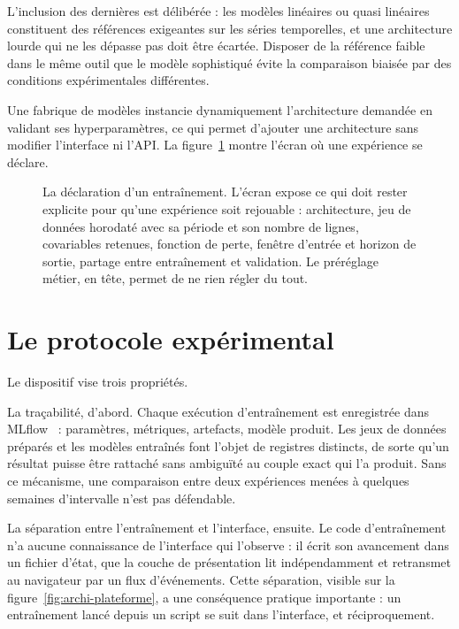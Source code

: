 L'inclusion des dernières est délibérée : les modèles linéaires ou quasi linéaires constituent
des références exigeantes sur les séries temporelles, et une architecture lourde qui ne les
dépasse pas doit être écartée. Disposer de la référence faible dans le même outil que le modèle
sophistiqué évite la comparaison biaisée par des conditions expérimentales différentes.

Une fabrique de modèles instancie dynamiquement l'architecture demandée en validant ses
hyperparamètres, ce qui permet d'ajouter une architecture sans modifier l'interface ni l'API.
La figure~\ref{fig:ia-config} montre l'écran où une expérience se déclare.

\begin{figure}[htbp]
\centering
{}
\caption{La déclaration d'un entraînement. L'écran expose ce qui doit rester explicite pour
qu'une expérience soit rejouable : architecture, jeu de données horodaté avec sa période et son
nombre de lignes, covariables retenues, fonction de perte, fenêtre d'entrée et horizon de sortie,
partage entre entraînement et validation. Le préréglage métier, en tête, permet de ne rien régler
du tout.}
\label{fig:ia-config}
\end{figure}

\section{Le protocole expérimental}

Le dispositif vise trois propriétés.

La traçabilité, d'abord. Chaque exécution d'entraînement est enregistrée dans MLflow~\cite{mlflow} : paramètres, métriques, artefacts, modèle produit. Les jeux de
données préparés et les modèles entraînés font l'objet de registres distincts, de sorte qu'un
résultat puisse être rattaché sans ambiguïté au couple exact qui l'a produit. Sans ce mécanisme,
une comparaison entre deux expériences menées à quelques semaines d'intervalle n'est pas
défendable.

La séparation entre l'entraînement et l'interface, ensuite. Le code d'entraînement n'a aucune
connaissance de l'interface qui l'observe : il écrit son avancement dans un fichier d'état, que
la couche de présentation lit indépendamment et retransmet au navigateur par un flux
d'événements. Cette séparation, visible sur la figure~\ref{fig:archi-plateforme}, a une
conséquence pratique importante : un entraînement lancé depuis un script se suit dans
l'interface, et réciproquement.

